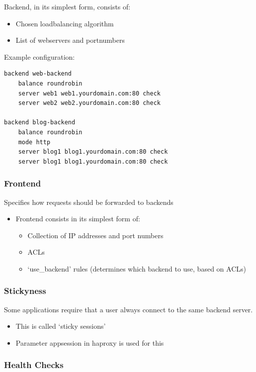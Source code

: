 \documentclass{article}
\begin{document}
Backend, in its simplest form, consists of:

\begin{itemize}
    \item Chosen loadbalancing algorithm
    \item List of webservers and portnumbers
\end{itemize}

Example configuration:

\begin{verbatim}
backend web-backend
    balance roundrobin
    server web1 web1.yourdomain.com:80 check
    server web2 web2.yourdomain.com:80 check

backend blog-backend
    balance roundrobin
    mode http
    server blog1 blog1.yourdomain.com:80 check
    server blog1 blog1.yourdomain.com:80 check
\end{verbatim}

\subsubsection{Frontend}

Specifies how requests should be forwarded to backends

\begin{itemize}
    \item Frontend consists in its simplest form of:
    \begin{itemize}
        \item Collection of IP addresses and port numbers
        \item ACLs
        \item `use\_backend' rules (determines which backend to use, based on ACLs)
    \end{itemize}
\end{itemize}

\subsubsection{Stickyness}

Some applications require that a user always connect to the same backend server.

\begin{itemize}
    \item This is called `sticky sessions'
    \item Parameter appsession in haproxy is used for this
\end{itemize}

\subsubsection{Health Checks}
\end{document}
